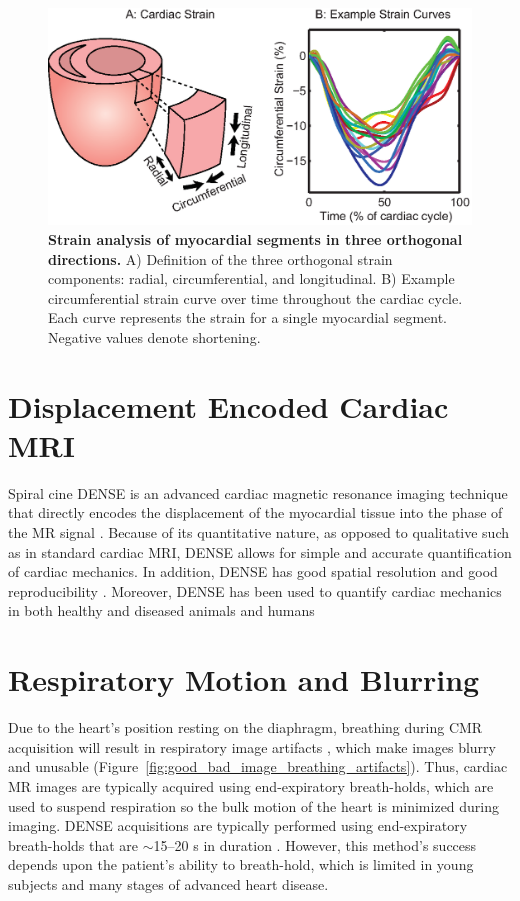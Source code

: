  	\begin{figure}
 		\centering
 		\includegraphics{figures/intro/3D_strain_explanation}
 		\caption[Strain analysis of myocardial segments in three orthogonal directions]{\textbf{Strain analysis of myocardial segments in three orthogonal directions.} A) Definition of the three orthogonal strain components: radial, circumferential, and longitudinal. B) Example circumferential strain curve over time throughout the cardiac cycle. Each curve represents the strain for a single myocardial segment. Negative values denote shortening.}
 		\label{fig:3D_strain_explanation}
 	\end{figure}

\section{Displacement Encoded Cardiac MRI}
	Spiral cine DENSE is an advanced cardiac magnetic resonance imaging technique that directly encodes the displacement of the myocardial tissue into the phase of the MR signal \cite{Aletras1999b}. Because of its quantitative nature, as opposed to qualitative such as in standard cardiac MRI, DENSE allows for simple and accurate quantification of cardiac mechanics. In addition, DENSE has good spatial resolution and good reproducibility \cite{Haggerty2013,Wehner2015a}. Moreover, DENSE has been used to quantify cardiac mechanics in both healthy and diseased animals and humans \cite{Aletras1999b,Aletras1999c,Kim2004,Ernande2012,Haggerty2013}

\section{Respiratory Motion and Blurring}
	Due to the heart's position resting on the diaphragm, breathing during CMR acquisition will result in respiratory image artifacts \cite{Axel1986}, which make images blurry and unusable (Figure~\ref{fig:good_bad_image_breathing_artifacts}). Thus, cardiac MR images are typically acquired using end-expiratory breath-holds, which are used to suspend respiration so the bulk motion of the heart is minimized during imaging. DENSE acquisitions are typically performed using end-expiratory breath-holds that are $\sim$15--20 s in duration \cite{Kim2004,Zhong2006a,Ernande2012,Zhong2010a,Aletras2005,Spottiswoode2007,Young2012c}. However, this method's success depends upon the patient's ability to breath-hold, which is limited in young subjects and many stages of advanced heart disease.
	
